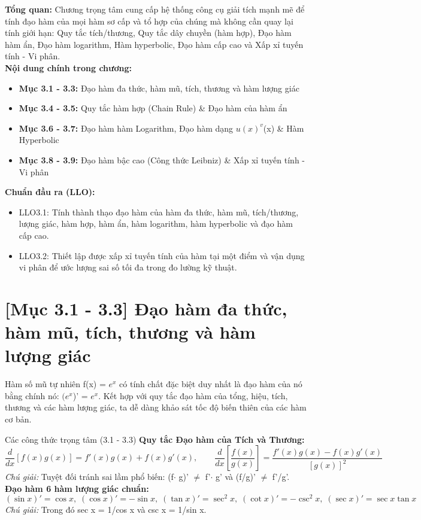 \documentclass[11pt,a4paper,oneside]{book}
\begin{document}
\begin{tcolorbox}[colback=slate!5!white,colframe=slate!75!black,title={\textbf{Mục lục Chương 3 \& Chuẩn đầu ra (Buổi 3)}}]
\textbf{Tổng quan:} Chương trọng tâm cung cấp hệ thống công cụ giải tích mạnh mẽ để tính đạo hàm của mọi hàm sơ cấp và tổ hợp của chúng mà không cần quay lại tính giới hạn: Quy tắc tích/thương, Quy tắc dây chuyền (hàm hợp), Đạo hàm hàm ẩn, Đạo hàm logarithm, Hàm hyperbolic, Đạo hàm cấp cao và Xấp xỉ tuyến tính - Vi phân.\\[6pt]
\textbf{Nội dung chính trong chương:}
\begin{itemize}[leftmargin=1.5em, itemsep=2pt]
  \item \textbf{Mục 3.1 - 3.3:} Đạo hàm đa thức, hàm mũ, tích, thương và hàm lượng giác
  \item \textbf{Mục 3.4 - 3.5:} Quy tắc hàm hợp (Chain Rule) \& Đạo hàm của hàm ẩn
  \item \textbf{Mục 3.6 - 3.7:} Đạo hàm hàm Logarithm, Đạo hàm dạng $u(x)^v$(x) \& Hàm Hyperbolic
  \item \textbf{Mục 3.8 - 3.9:} Đạo hàm bậc cao (Công thức Leibniz) \& Xấp xỉ tuyến tính - Vi phân
\end{itemize}
\textbf{Chuẩn đầu ra (LLO):}
\begin{itemize}[leftmargin=1.5em, itemsep=2pt]
  \item LLO3.1: Tính thành thạo đạo hàm của hàm đa thức, hàm mũ, tích/thương, lượng giác, hàm hợp, hàm ẩn, hàm logarithm, hàm hyperbolic và đạo hàm cấp cao.
  \item LLO3.2: Thiết lập được xấp xỉ tuyến tính của hàm tại một điểm và vận dụng vi phân để ước lượng sai số tối đa trong đo lường kỹ thuật.
\end{itemize}
\end{tcolorbox}

\section{[Mục 3.1 - 3.3] Đạo hàm đa thức, hàm mũ, tích, thương và hàm lượng giác}
Hàm số mũ tự nhiên f(x) = $e^x$ có tính chất đặc biệt duy nhất là đạo hàm của nó bằng chính nó: $(e^x$)' = $e^x$. Kết hợp với quy tắc đạo hàm của tổng, hiệu, tích, thương và các hàm lượng giác, ta dễ dàng khảo sát tốc độ biến thiên của các hàm cơ bản.

\begin{congthuc}{Các công thức trọng tâm (3.1 - 3.3)}
\noindent\textbf{Quy tắc Đạo hàm của Tích và Thương:}
\[ \frac{d}{dx}[f(x)g(x)] = f'(x)g(x) + f(x)g'(x), \qquad \frac{d}{dx}\left[\frac{f(x)}{g(x)}\right] = \frac{f'(x)g(x) - f(x)g'(x)}{[g(x)]^2} \]
\noindent\textit{Chú giải:} Tuyệt đối tránh sai lầm phổ biến: (f$\cdot$ g)' $\neq$  f'$\cdot$ g' và (f/g)' $\neq$  f'/g'.\\[4pt]
\noindent\textbf{Đạo hàm 6 hàm lượng giác chuẩn:}
\[ (\sin x)' = \cos x, \; (\cos x)' = -\sin x, \; (\tan x)' = \sec^2 x, \; (\cot x)' = -\csc^2 x, \; (\sec x)' = \sec x\tan x \]
\noindent\textit{Chú giải:} Trong đó sec x = 1/cos x và csc x = 1/sin x.\\[4pt]
\end{congthuc}
\end{document}

